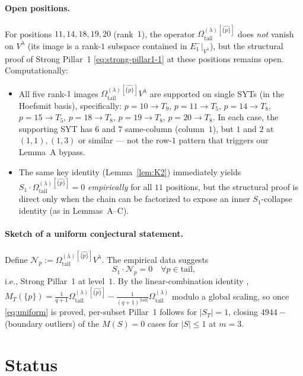 \documentclass[11pt]{article}
\theoremstyle{definition}
\newcommand{\Vlam}{V^\lambda}
\newcommand{\Omtail}{\Omega^{(\lambda)}_{\mathrm{tail}}}
\newcommand{\Eminus}[1]{E^-_{#1}}
\begin{document}
\paragraph{Open positions.}
For positions $11, 14, 18, 19, 20$ (rank~$1$), the operator
$\Omtail^{[\widehat{\{p\}}]}$ does \emph{not} vanish on $\Vlam$ (its image is a
rank-$1$ subspace contained in $\Eminus 1|_{\Vlam}$), but the structural proof
of Strong Pillar~1 \eqref{eq:strong-pillar1-1} at these positions remains open.
Computationally:
\begin{itemize}[topsep=0.2em,itemsep=0.1em]
\item All five rank-$1$ images $\Omtail^{[\widehat{\{p\}}]} \Vlam$ are supported on
   single SYTs (in the Hoefsmit basis), specifically: $p=10 \to T_9$, $p=11 \to T_5$,
   $p=14 \to T_8$, $p=15 \to T_5$, $p=18 \to T_8$, $p=19 \to T_8$, $p=20 \to T_8$.
   In each case, the supporting SYT has $6$ and $7$ same-column (column~$1$), but
   $1$ and $2$ at $(1,1), (1,3)$ or similar — not the row-$1$ pattern that triggers
   our Lemma~A bypass.
\item The same key identity (Lemma~\ref{lem:K2}) immediately yields
   $S_1 \cdot \Omtail^{[\widehat{\{p\}}]} = 0$ \emph{empirically} for all $11$
   positions, but the structural proof is direct only when the chain can be
   factorized to expose an inner $S_1$-collapse identity (as in Lemmas~A--C).
\end{itemize}

\paragraph{Sketch of a uniform conjectural statement.}
Define
$\mathcal{N}_p := \Omtail^{[\widehat{\{p\}}]} \Vlam$. The empirical data suggests
\begin{equation}\label{eq:uniform}
   S_1 \cdot \mathcal{N}_p = 0 \quad \forall p \in \mathrm{tail},
\end{equation}
i.e., Strong Pillar~1 at level~$1$. By the linear-combination identity
\cite[Prop.~\ref{prop:identity}]{persubset},
$M_T(\{p\}) = \frac{1}{q+1}\Omtail^{[\widehat{\{p\}}]} - \frac{1}{(q+1)^{|\mathrm{tail}|}}\Omtail$
modulo a global scaling, so once \eqref{eq:uniform} is proved, per-subset
Pillar~1 follows for $|S_T| = 1$, closing $4944 - $ (boundary outliers) of the
$M(S) = 0$ cases for $|S| \le 1$ at $m = 3$.

\section{Status}
\end{document}

